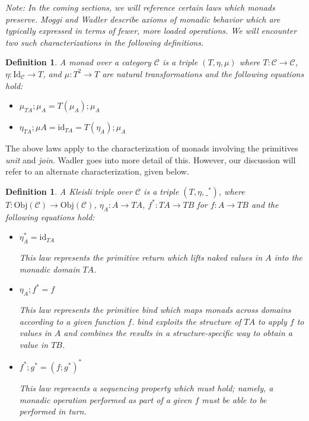\documentclass[ms]{byuprop}
\newcounter{definition}
\begin{document}
\emph{Note: In the coming sections, we will reference certain laws which monads preserve.
Moggi \cite{moggi1989computational} and Wadler \cite{wadler1995monads} describe axioms of 
monadic behavior which are typically expressed in terms of fewer, more loaded operations. 
We will encounter two such characterizations in the following definitions.}

\newtheorem{monad}[definition]{Definition}

\begin{monad}
A \emph{monad} over a category $\mathcal{C}$ is a triple $(T,\eta,\mu)$ where
$T:\mathcal{C}\rightarrow\mathcal{C}$, $\eta:\mathrm{Id}_{\mathcal{C}}\rightarrow T$, and
$\mu:T^{2}\rightarrow T$ are \emph{natural transformations} and the following equations
hold:

\begin{itemize}
\item $\mu_{TA};\mu_{A}=T(\mu_{A});\mu_{A}$
\item $\eta_{TA};\mu{A}=\mathrm{id}_{TA}=T(\eta_{A});\mu_{A}$
\end{itemize}
\end{monad}

The above laws apply to the characterization of monads involving the primitives
\emph{unit} and \emph{join}. Wadler \cite{wadler1995monads} goes into more detail of this.
However, our discussion will refer to an alternate characterization, given below.

\newtheorem{kleisli}[definition]{Definition}

\begin{kleisli}
A \emph{Kleisli triple} over $\mathcal{C}$ is a triple $(T,\eta,\_^{*})$, where
$T:\mathrm{Obj}(\mathcal{C})\rightarrow \mathrm{Obj}(\mathcal{C})$, $\eta_{A}:A\rightarrow TA$,
$f^{*}:TA\rightarrow TB$ for $f:A\rightarrow TB$ and the following equations hold:

\begin{itemize}
\item $\eta_{A}^{*}=\mathrm{id}_{TA}$

This law represents the primitive \emph{return} which lifts naked values in $A$ into the monadic domain $TA$.

\item $\eta_{A};f^{*}=f$

This law represents the primitive \emph{bind} which maps monads across domains according to a given function $f$. \emph{bind} exploits the structure of $TA$ to apply $f$ to values in $A$ and combines the results in a structure-specific way to obtain a value in $TB$.

\item $f^{*};g^{*}=(f;g^{*})^{*}$

This law represents a sequencing property which must hold; namely, a monadic operation performed as part of a given $f$ must be able to be performed in turn.
\end{itemize}
\end{kleisli}
\end{document}
